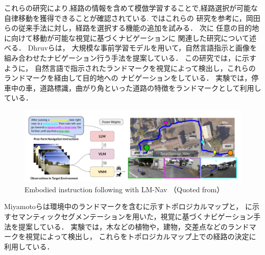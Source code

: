 これらの研究により,経路の情報を含めて模倣学習することで,経路選択が可能な
自律移動を獲得できることが確認されている.
ではこれらの
研究を参考に，岡田らの従来手法に対し，経路を選択する機能の追加を試みる．
\newpage
次に
任意の目的地に向けて移動が可能な視覚に基づくナビゲーションに
関連した研究について述べる．
Dhruvら\cite{shah2022lmnav}は，
大規模な事前学習モデルを用いて，自然言語指示と画像を組み合わせたナビゲーション行う手法を提案している．
この研究では，に示すように，
自然言語で指示されたランドマークを視覚によって検出し，これらのランドマークを経由して目的地への
ナビゲーションをしている．
実験では，停車中の車，道路標識，曲がり角といった道路の特徴をランドマークとして利用している．

\begin{figure}[htbp]
    \centering
     \includegraphics[width=120mm]{images/pdf/lmnav.pdf}
     \caption{Embodied instruction following with LM-Nav （Quoted from\cite{shah2022lmnav}）}
     \label{fig:lmnav}
\end{figure}
\newpage
Miyamotoら\cite{miyamoto}は環境中のランドマークを含むに示すトポロジカルマップと，
に示すセマンティックセグメンテーションを用いた，視覚に基づくナビゲーション手法を提案している．
実験では，木などの植物や，建物，交差点などのランドマークを視覚によって検出し，
これらをトポロジカルマップ上での経路の決定に利用している．


